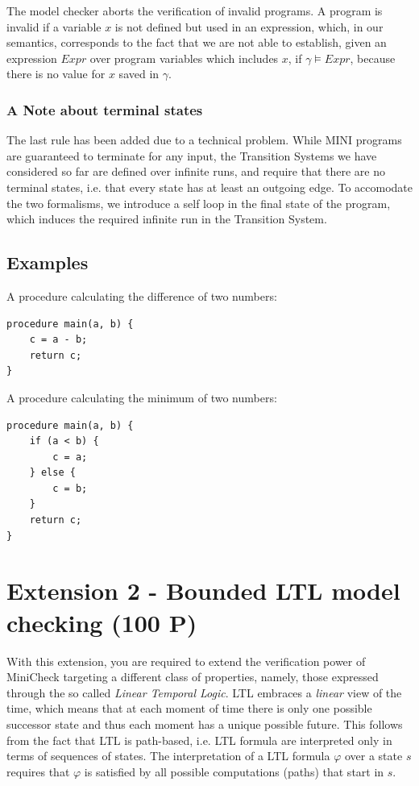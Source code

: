 \documentclass{article}
\begin{document}
The model checker aborts the verification of invalid programs. A program is invalid if a variable $x$ is not defined but used in an expression, which, in our semantics, corresponds to the fact that we are not able to establish, given an expression $Expr$ over program variables which includes $x$, if $\gamma \vDash Expr$, because there is no value for $x$ saved in $\gamma$.

\subsubsection*{A Note about terminal states}
The last rule has been added due to a technical problem. While MINI programs are guaranteed to terminate for any input, the Transition Systems we have considered so far are defined over infinite runs, and require that there are no terminal states, i.e. that every state has at least an outgoing edge. To accomodate the two formalisms, we introduce a self loop in the final state of the program, which induces the required infinite run in the Transition System.

\subsection{Examples}

A procedure calculating the difference of two numbers:
\begin{lstlisting}
procedure main(a, b) {
    c = a - b;
    return c;
}
\end{lstlisting}

A procedure calculating the minimum of two numbers:
\begin{lstlisting}
procedure main(a, b) {
    if (a < b) {
        c = a;
    } else {
        c = b;
    }
    return c;
}
\end{lstlisting}


\section{Extension 2 - Bounded LTL model checking (100 P)}
\label{sec:ext2}
With this extension, you are required to extend the verification power of MiniCheck targeting a different class of properties, namely, those expressed through the so called \emph{Linear Temporal Logic}. LTL embraces a \emph{linear} view of the time, which means that at each moment of time there is only one possible successor state and thus each moment has a unique possible future. This follows from the fact that LTL is path-based, i.e. LTL formula are interpreted only in terms of sequences of states. The interpretation of a LTL formula $\varphi$ over a state $s$ requires that $\varphi$ is satisfied by all possible computations (paths) that start in $s$.
\end{document}
